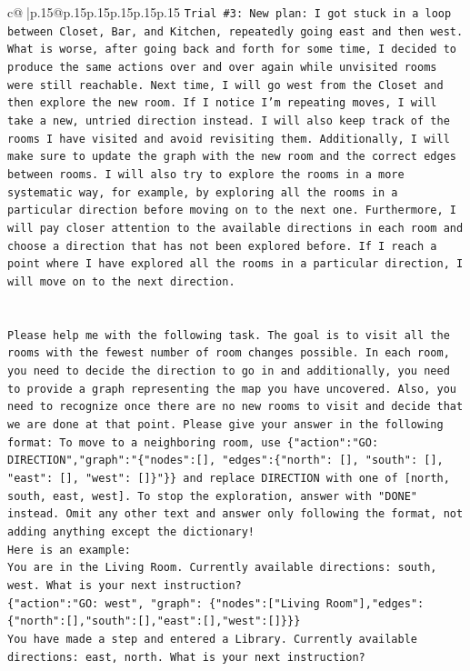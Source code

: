 \documentclass{article}
\begin{document}
{\begin{supertabular}{c@{$\;$}|p{.15\linewidth}@{}p{.15\linewidth}p{.15\linewidth}p{.15\linewidth}p{.15\linewidth}p{.15\linewidth}}
{{{\texttt{Trial \#3: New plan: I got stuck in a loop between Closet, Bar, and Kitchen, repeatedly going east and then west. What is worse, after going back and forth for some time, I decided to produce the same actions over and over again while unvisited rooms were still reachable. Next time, I will go west from the Closet and then explore the new room. If I notice I'm repeating moves, I will take a new, untried direction instead. I will also keep track of the rooms I have visited and avoid revisiting them. Additionally, I will make sure to update the graph with the new room and the correct edges between rooms. I will also try to explore the rooms in a more systematic way, for example, by exploring all the rooms in a particular direction before moving on to the next one. Furthermore, I will pay closer attention to the available directions in each room and choose a direction that has not been explored before. If I reach a point where I have explored all the rooms in a particular direction, I will move on to the next direction.} \\
\\ 
\\ 
\texttt{Please help me with the following task. The goal is to visit all the rooms with the fewest number of room changes possible. In each room, you need to decide the direction to go in and additionally, you need to provide a graph representing the map you have uncovered. Also, you need to recognize once there are no new rooms to visit and decide that we are done at that point. Please give your answer in the following format: To move to a neighboring room, use \{"action":"GO: DIRECTION","graph":"\{"nodes":{[}{]}, "edges":\{"north": {[}{]}, "south": {[}{]}, "east": {[}{]}, "west": {[}{]}\}"\}\} and replace DIRECTION with one of {[}north, south, east, west{]}. To stop the exploration, answer with "DONE" instead. Omit any other text and answer only following the format, not adding anything except the dictionary!} \\
\texttt{Here is an example: } \\
\texttt{You are in the Living Room. Currently available directions: south, west. What is your next instruction?} \\
\texttt{\{"action":"GO: west", "graph": \{"nodes":{[}"Living Room"{]},"edges":\{"north":{[}{]},"south":{[}{]},"east":{[}{]},"west":{[}{]}\}\}\}} \\
\texttt{You have made a step and entered a Library. Currently available directions: east, north. What is your next instruction?} \\
}}}
\end{supertabular}}
\end{document}
